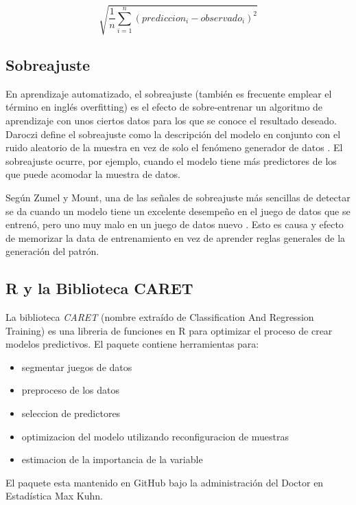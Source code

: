 \begin{equation}
\sqrt{\frac{1}{n}\sum_{i=1}^n(prediccion_{i} - observado_{i})^{2}}
\end{equation}

\subsection{Sobreajuste}
En aprendizaje automatizado, el sobreajuste (también es frecuente emplear el término en inglés overfitting) es el efecto de sobre-entrenar un algoritmo de aprendizaje con unos ciertos datos para los que se conoce el resultado deseado. Daroczi define el sobreajuste como la descripción del modelo en conjunto con el ruido aleatorio de la muestra en vez de solo el fenómeno generador de datos \cite{daroczi}. El sobreajuste ocurre, por ejemplo, cuando el modelo tiene más predictores de los que puede acomodar la muestra de datos.

Según Zumel y Mount, una de las señales de sobreajuste más sencillas de detectar se da cuando un modelo tiene un excelente desempeño en el juego de datos que se entrenó, pero uno muy malo en un juego de datos nuevo \cite{zumelMount}. Esto es causa y efecto de memorizar la data de entrenamiento en vez de aprender reglas generales de la generación del patrón.

\subsection{R y la Biblioteca CARET}
La biblioteca \emph{CARET} (nombre extraído de Classification And Regression Training) es una libreria de funciones en R para optimizar el proceso de crear modelos predictivos. El paquete contiene herramientas para:

\begin{itemize}
	\item segmentar juegos de datos
	\item preproceso de los datos
	\item seleccion de predictores
	\item optimizacion del modelo utilizando reconfiguracion de muestras
	\item estimacion de la importancia de la variable
\end{itemize}

El paquete esta mantenido en GitHub bajo la administración del Doctor en Estadística Max Kuhn.
